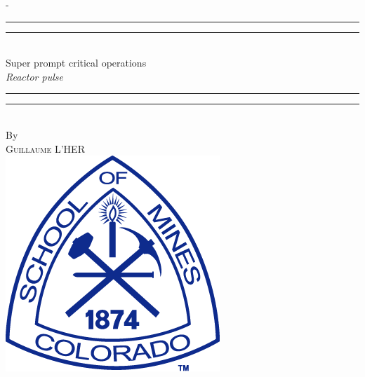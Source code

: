 %
%
% 
%
%
\begin{titlingpage}
\begin{SingleSpace}
\calccentering{\unitlength} 
\begin{adjustwidth*}{\unitlength}{-\unitlength}
\vspace*{13mm}
\begin{center}
\rule[0.5ex]{\linewidth}{2pt}\vspace*{-\baselineskip}\vspace*{3.2pt}
\rule[0.5ex]{\linewidth}{1pt}\\[\baselineskip]
{\HUGE Super prompt critical operations }\\[4mm]
{\Large \textit{Reactor pulse}}\\
\rule[0.5ex]{\linewidth}{1pt}\vspace*{-\baselineskip}\vspace{3.2pt}
\rule[0.5ex]{\linewidth}{2pt}\\
\vspace{6.5mm}
{\large By}\\
\vspace{6.5mm}
{\large\textsc{Guillaume L'HER}}\\
\vspace{11mm}
\includegraphics[scale=0.6]{logos/CSM}\\

\end{center}
\end{adjustwidth*}
\end{SingleSpace}
\end{titlingpage}
